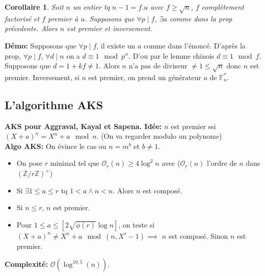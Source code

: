 \documentclass[12pt]{article}
\theoremstyle{plain}
\newtheorem{cor}[subsubsection]{Corollaire}
\theoremstyle{definition}
\newcommand{\Z}{\mathbb{Z}}
\newcommand{\F}{\mathbb{F}}
\newcommand{\Or}{\mathcal{O}}
\begin{document}
\begin{cor}
    Soit $n$ un entier tq $n-1=f.u$ avec $f\geq\sqrt{n}$,
    $f$ complètement factorisé et $f$ premier à $u$. 
    Supposons que $\forall p\mid f$, $\exists a$ comme 
    dans la prop précedente. Alors $n$ est premier et 
    inversement.
\end{cor}
\textbf{Démo:} Supposons que $\forall p\mid f$, il existe 
un $a$ comme dans l'énoncé. D'après la prop, $\forall p\mid f$,
$\forall d\mid n$ on a $d\equiv1\mod p^{\alpha}$. D'ou 
par le lemme chinois $d\equiv 1\mod f$. Supposons que 
$d=1+kf\neq 1$. Alors $n$ n'a pas de diviseur $\neq1\leq 
\sqrt{n}$ donc $n$ est premier. Inversement, si 
$n$ est premier, on prend un générateur $a$ de $\F_n^*$.

\subsection{L'algorithme AKS}
\textbf{AKS pour Aggraval, Kayal et Sapena. Idée:} $n$ 
est premier ssi $(X+a)^n=X^n+a\mod n$. (On va regarder 
modulo un polynome)\\
\indent \textbf{Algo AKS:} On évince le cas ou $n=m^b$ et $b\ne1$.
\begin{itemize}
    \item On pose $r$ minimal tel que $\Or_r(n)\geq 4
    \log^2n$ avec ($\Or_r(n)$ l'ordre de $n$ dans $(\Z/r\Z)^{\times}$)
    \item Si $\exists1\leq a\leq r$ tq $1<a\wedge n<n$. Alors 
    $n$ est composé.
    \item Si $n\leq r$, $n$ est premier.
    \item Pour $1\leq a\leq [2\sqrt{\phi(r)}\log n]$,
    on teste si $(X+a)^n\neq X^n+a\mod (n, X^r-1)\implies$
    $n$ est composé. Sinon $n$ est premier.
\end{itemize}

\textbf{Complexité:} $\Or(\log^{10,5}(n))$.
\end{document}
